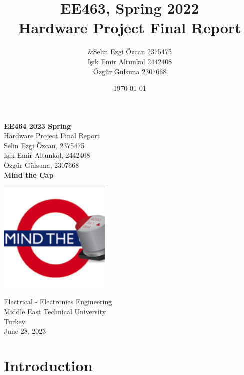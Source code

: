\documentclass[12pt]{article}
\title{\textbf{EE463, Spring 2022} \\ Hardware Project Final Report }
\author{&Selin Ezgi Özcan 2375475 \\ Işık Emir Altunkol 2442408 \\ Özgür Gülsuna 2307668}
\date{\today}
\begin{document}
\begin{titlepage}
   \begin{center}
       \vspace*{1cm}
        
       \Huge
       \textbf{EE464 2023 Spring} \\
       \Large
       \vspace{0.5cm}
        Hardware Project Final Report\\
       \Large
       \vspace{0.5cm}  
        \large
       Selin Ezgi Özcan, 2375475 \\
       \vspace{0.2cm}
       Işık Emir Altunkol, 2442408 \\
       \vspace{0.2cm}
       Özgür Gülsuna, 2307668     \\
       \vspace{1.1cm}
        \textbf{Mind the Cap}
       \normalsize
       \vspace{2cm}
        
     
       \includegraphics[width=0.4\textwidth]{img/mindthecap.jpg}
            
       Electrical - Electronics Engineering\\
       Middle East Technical University\\
       Turkey\\
       \vspace{4cm}
       June 28, 2023
            
   \end{center}
\end{titlepage}

\tableofcontents


\newpage

\section{Introduction}
\end{document}
